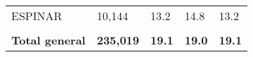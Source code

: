 \begin{tabular}{lllll}
	\cellcolor[HTML]{FF5050}ESPINAR                                & 10,144                                                                & 13.2                                                                             & 14.8                                                                        & 13.2                                                                                \\
	&                                                                       &                                                                                  &                                                                             &                                                                                     \\
	\rowcolor[HTML]{DDEBF7} 
	\textbf{Total   general}                                       & \textbf{235,019}                                                      & \textbf{19.1}                                                                    & \textbf{19.0}                                                               & \textbf{19.1}                                                                      
\end{tabular}